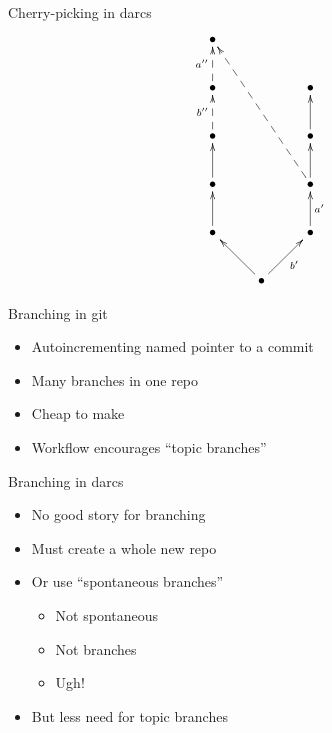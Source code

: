 \documentclass[pdf]{prosper}
\begin{document}
\begin{slide}{Cherry-picking in darcs}
\[
\xymatrix{
	\bullet \\
	\bullet \ar@{-->}[u]^{a''} && \bullet \\
	\bullet \ar@{-->}[u]^{b''} && \bullet \ar[u] \\
	\bullet \ar[u] && \bullet \ar[u] \ar@{-->}[uuull] \\
	\bullet \ar[u] && \bullet \ar[u]_{a'} \\
	& \bullet \ar[ul] \ar[ur]_{b'}
}
\]
\end{slide}


\begin{slide}{Branching in git}
\begin{itemize}
\item Autoincrementing named pointer to a commit
\item Many branches in one repo
\item Cheap to make
\item Workflow encourages ``topic branches''
\end{itemize}
\end{slide}

\begin{slide}{Branching in darcs}
\begin{itemize}
\item No good story for branching
\item Must create a whole new repo
\item Or use ``spontaneous branches''
\begin{itemize}
\item Not spontaneous
\item Not branches
\item Ugh!
\end{itemize}
\item But less need for topic branches
\end{itemize}
\end{slide}

\end{document}
